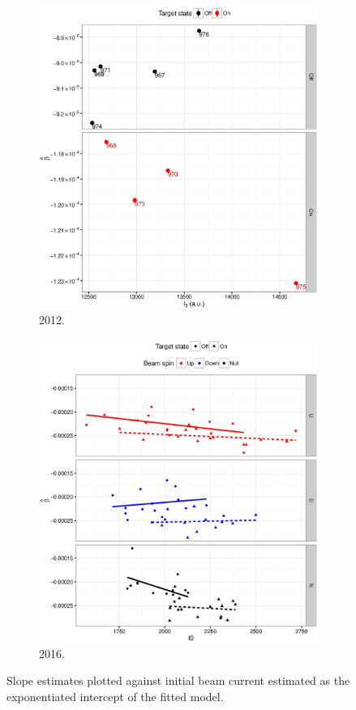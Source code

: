 \documentclass[reprint]{revtex4-1}
\newcommand{\scl}{.4}
\begin{document}
\begin{figure}
\begin{subfigure}{.5\textwidth}
\includegraphics[scale=\scl]{img/Slope_VS_IniCurrent.eps}
\caption{2012.}
\end{subfigure}
\begin{subfigure}{.5\textwidth}
\includegraphics[scale=\scl]{img/Slope_VS_IniCurrent_2016.eps}
\caption{2016.\label{fig:SlpOnI02016}}
\end{subfigure}
\caption{Slope estimates plotted against initial beam current estimated as the exponentiated intercept of the fitted model.\label{fig:SlpOnI0}}
\end{figure}
\end{document}
